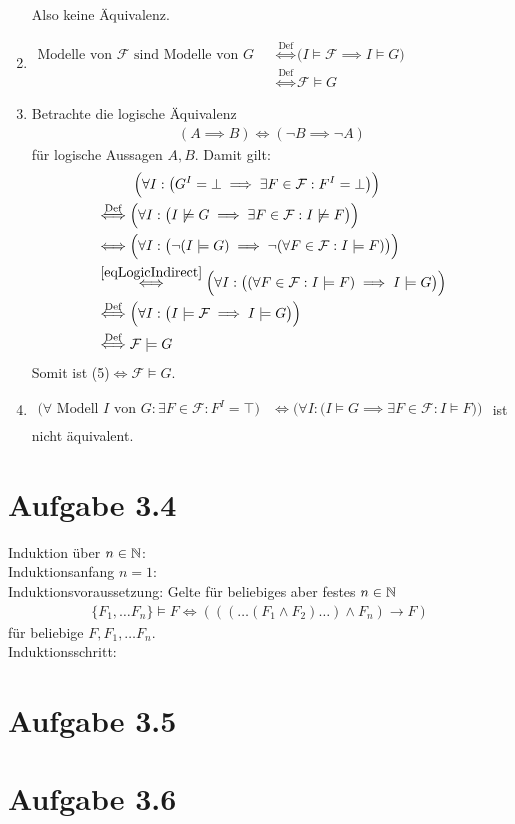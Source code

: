 \documentclass[12pt,a4paper]{article}
\newcommand{\F}{\mathcal{F}}
\begin{document}
\begin{enumerate}[label=(\arabic*)]
Also keine Äquivalenz.
\item $\begin{aligned}
\text{Modelle von $\F$ sind Modelle von $G$ }
&\stackrel{\text{Def}}{\Longleftrightarrow}
\big(I\models\F\implies I\models G\big)\\
&\stackrel{\text{Def}}{\Longleftrightarrow}
\F\models G
\end{aligned}$
\item Betrachte die logische Äquivalenz
\begin{align}\label{eqLogicIndirect}
(A\implies B)\Longleftrightarrow(\neg B\implies\neg A)
\end{align}
für logische Aussagen $A,B$. Damit gilt:
\begin{align*}
&~~\qquad\Big(\forall I:\big(G^I=\bot\implies\exists F\in\F:F^I=\bot\big)\Big)\\
&\stackrel{\text{Def}}{\Longleftrightarrow}
\Big(\forall I:\big(I\not\models G\implies\exists F\in\F:I\not\models F\big)\Big)\\
&\stackrel{\text{}}{\Longleftrightarrow}
\Big(\forall I:\big(\neg(I\models G)\implies\neg(\forall F\in\F:I\models F)\big)\Big)\\
&\stackrel{\eqref{eqLogicIndirect}}{\Longleftrightarrow}
\Big(\forall I:\big((\forall F\in\F:I\models F)\implies I\models G\big)\Big)\\
&\stackrel{\text{Def}}{\Longleftrightarrow}
\Big(\forall I:\big(I\models \F\implies I\models G\big)\Big)\\
&\stackrel{\text{Def}}{\Longleftrightarrow}
\F\models G
\end{align*}
Somit ist (5)$\Longleftrightarrow\F\models G$.
\item $\begin{aligned}
\Big(\forall\text{ Modell $I$ von }G:\exists F\in\F:F^I=\top\Big)
&\stackrel{}{\Longleftrightarrow}
\Big(\forall I:\big(I\models G\implies \exists F\in\F:I\models F\big)\Big)\\
\end{aligned}$
ist nicht äquivalent. 
\end{enumerate}

\section*{Aufgabe 3.4}
Induktion über $n\in\mathbb{N}$:\\
Induktionsanfang $n=1$:\\

Induktionsvoraussetzung: Gelte für beliebiges aber festes $n\in\mathbb{N}$
\begin{align*}
\lbrace F_1,\ldots F_n\rbrace\models F\Longleftrightarrow(((\ldots(F_1\wedge F_2)\ldots)\wedge F_n)\to F)
\end{align*}
für beliebige $F,F_1,\ldots F_n$.\\

Induktionsschritt:

\section*{Aufgabe 3.5}

\section*{Aufgabe 3.6}
\end{document}
